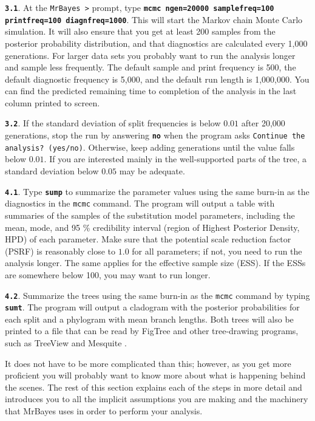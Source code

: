 \documentclass[12pt]{book}
\newcommand{\ttt}[1]{\texttt{#1}}
\newcommand{\tb}[1]{\ttt{\textbf{#1}}}
\begin{document}
\tb{3.1}. At the \texttt{MrBayes >} prompt, type \tb{mcmc ngen=20000 samplefreq=100}\\
\tb{printfreq=100 diagnfreq=1000}. This will start the Markov chain Monte Carlo simulation. It will
also ensure that you get at least 200 samples from the posterior probability distribution, and that
diagnostics are calculated every 1,000 generations. For larger data sets you probably want to run
the analysis longer and sample less frequently. The default sample and print frequency is 500, the
default diagnostic frequency is 5,000, and the default run length is 1,000,000. You can find the
predicted remaining time to completion of the analysis in the last column printed to screen.

\tb{3.2}. If the standard deviation of split frequencies is below $0.01$ after 20,000 generations,
stop the run by answering \tb{no} when the program asks \texttt{Continue the analysis? (yes/no)}.
Otherwise, keep adding generations until the value falls below $0.01$. If you are interested mainly
in the well-supported parts of the tree, a standard deviation below $0.05$ may be adequate.

\tb{4.1}. Type \tb{sump} to summarize the parameter values using the same burn-in as the
diagnostics in the \texttt{mcmc} command. The program will output a table with summaries of the
samples of the substitution model parameters, including the mean, mode, and 95 \% credibility
interval (region of Highest Posterior Density, HPD) of each parameter. Make sure that the potential
scale reduction factor (PSRF) is reasonably close to $1.0$ for all parameters; if not, you need to
run the analysis longer. The same applies for the effective sample size (ESS). If the ESSs are
somewhere below 100, you may want to run longer.

\tb{4.2}. Summarize the trees using the same burn-in as the \texttt{mcmc} command by typing
\tb{sumt}.  The program will output a cladogram with the posterior probabilities for each split and
a phylogram with mean branch lengths. Both trees will also be printed to a file that can be read by
FigTree \citep{rambaut12} and other tree-drawing programs, such as TreeView \citep{page96} and
Mesquite \citep{maddison06}.

It does not have to be more complicated than this; however, as you get more proficient you will
probably want to know more about what is happening behind the scenes. The rest of this section
explains each of the steps in more detail and introduces you to all the implicit assumptions you
are making and the machinery that MrBayes uses in order to perform your analysis.
\end{document}
